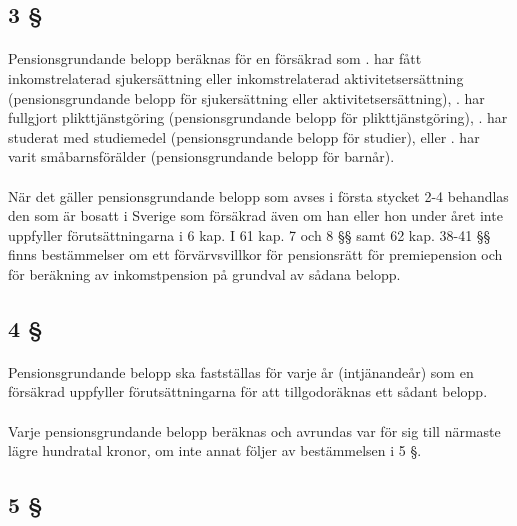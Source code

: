 \documentclass[a4paper,notitlepage,openany,10pt]{book}
\begin{document}
\subsection*{3 §}
\paragraph*{}
Pensionsgrundande belopp beräknas för en försäkrad som
. har fått inkomstrelaterad sjukersättning eller inkomstrelaterad aktivitetsersättning (pensionsgrundande belopp för sjukersättning eller aktivitetsersättning),
. har fullgjort plikttjänstgöring (pensionsgrundande belopp för plikttjänstgöring),
. har studerat med studiemedel (pensionsgrundande belopp för studier), eller
. har varit småbarnsförälder (pensionsgrundande belopp för barnår).
\paragraph*{}
När det gäller pensionsgrundande belopp som avses i första stycket 2-4 behandlas den som är bosatt i Sverige som försäkrad även om han eller hon under året inte uppfyller förutsättningarna i 6 kap. I 61 kap. 7 och 8 §§ samt 62 kap. 38-41 §§ finns bestämmelser om ett förvärvsvillkor för pensionsrätt för premiepension och för beräkning av inkomstpension på grundval av sådana belopp.
\subsection*{4 §}
\paragraph*{}
Pensionsgrundande belopp ska fastställas för varje år (intjänandeår) som en försäkrad uppfyller förutsättningarna för att tillgodoräknas ett sådant belopp.
\paragraph*{}
Varje pensionsgrundande belopp beräknas och avrundas var för sig till närmaste lägre hundratal kronor, om inte annat följer av bestämmelsen i 5 §.
\subsection*{5 §}
\end{document}
